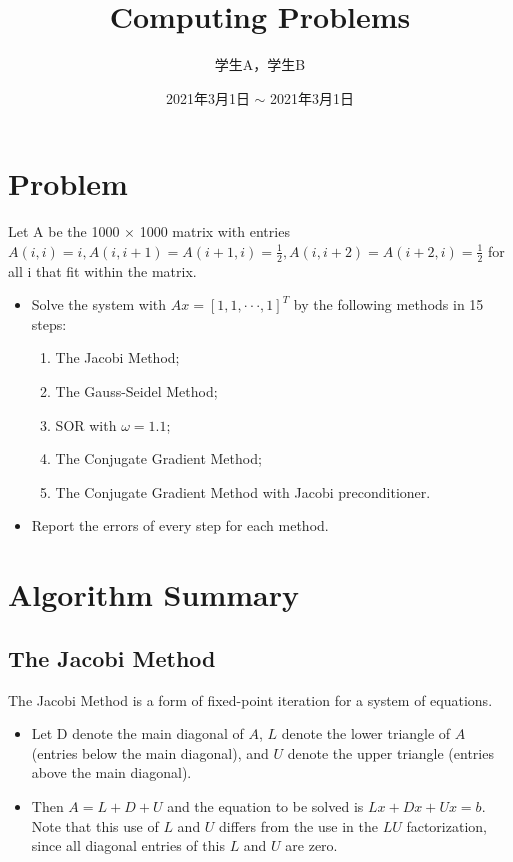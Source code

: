 \documentclass{ExpReport}
\author{学生A，学生B} %
\title{Computing Problems} %
\date{2021年3月1日 $\sim$ 2021年3月1日} %
\begin{document}
    \begingroup
    \renewcommand\arraystretch{1.65}
    \maketitle
    \endgroup

    \section{Problem}

    Let A be the 1000 $\times$ 1000 matrix with entries $A(i, i) = i, A(i, i + 1) =
A(i + 1, i) = \frac{1}{2}, A(i, i + 2) = A(i + 2, i) = \frac{1}{2}$ for all i that fit within the matrix.
    \begin{itemize}
        \item Solve the system with $Ax = [1, 1, · · · , 1]^T$ by the following methods in 15 steps:
        \begin{enumerate}
            \item The Jacobi Method;
            \item The Gauss-Seidel Method;
            \item SOR with $\omega = 1.1$;
            \item The Conjugate Gradient Method;
            \item The Conjugate Gradient Method with Jacobi preconditioner.
        \end{enumerate}
        \item Report the errors of every step for each method.
    \end{itemize}

    \section{Algorithm Summary}

    \subsection{The Jacobi Method}
    The Jacobi Method is a form of fixed-point iteration for a system of equations.

    \begin{itemize}
        \item Let D denote the main diagonal of $A$, $L$ denote the lower triangle of $A$ (entries below the main diagonal), and $U$ denote the upper triangle (entries above the main diagonal).
        \item Then $A = L + D + U$ and the equation to be solved is $L x + Dx + U x = b$. Note that this use of $L$ and $U$ differs from the use in the $LU$ factorization, since all diagonal entries of this $L$ and $U$ are zero.
    \end{itemize}
\end{document}
